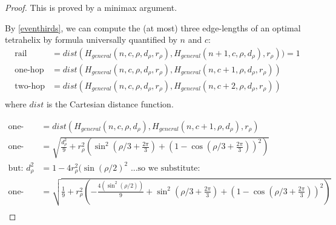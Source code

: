 \documentclass[review]{siamonline1116}
\begin{document}
\begin{proof}
This is proved by a minimax argument.

By \cref{eventhirds}, we can compute the (at most) three edge-lengths of an optimal
tetrahelix by formula universally quantified by $n$ and $c$:
\begin{align*}
  \text{rail} &= dist(H_{general}(n,c,\rho,d_{\rho},r_{\rho}),H_{general}(n+1,c,\rho,d_{\rho}),r_{\rho})) = 1 \\
  \text{one-hop} &= dist(H_{general}(n,c,\rho,d_{\rho},r_{\rho}),H_{general}(n,c+1,\rho,d_{\rho},r_{\rho}))  \\
  \text{two-hop} &= dist(H_{general}(n,c,\rho,d_{\rho},r_{\rho}),H_{general}(n,c+2,\rho,d_{\rho},r_{\rho}))  \\  
\end{align*}
where $dist$ is the Cartesian distance function.

\begin{align*}
  \text{one-hop} &= dist(H_{general}(n,c,\rho,d_{\rho}),H_{general}(n,c+1,\rho,d_{\rho}),r_{\rho})  \\
  \text{one-hop}  &= \sqrt{\frac{d_{\rho}^2}{9} + r_{\rho}^2(\sin^2(\rho/3 + \frac{2\pi}{3})  + (1 - \cos(\rho/3 + \frac{2\pi}{3}))^2)} \\
  \text{but: }  d_{\rho}^2 &= 1 - 4 r_{\rho}^2 (\sin( \rho / 2)^2 \text{ ...so we substitute:}\\
  \text{one-hop}  &= \sqrt{\frac{1}{9}  + r_{\rho}^2(-\frac{4 (\sin^2( \rho / 2))}{9} + \sin^2(\rho/3+ \frac{2\pi}{3})  + (1 - \cos(\rho/3 + \frac{2\pi}{3}))^2)} \\
\end{align*}


\end{proof}
\end{document}
